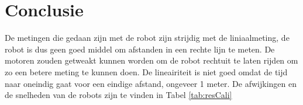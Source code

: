 \documentclass{report}
\begin{document}
\chapter{Conclusie}
De metingen die gedaan zijn met de robot zijn strijdig met de liniaalmeting,
de robot is dus geen goed middel om afstanden in een rechte lijn te meten.
De motoren zouden getweakt kunnen worden om de robot rechtuit te laten rijden om zo een betere meting te kunnen doen.
De lineairiteit is niet goed omdat de tijd naar oneindig gaat voor een eindige afstand,
ongeveer 1 meter.
De afwijkingen en de snelheden van de robots zijn te vinden in Tabel \ref{tab:resCali}
\end{document}
